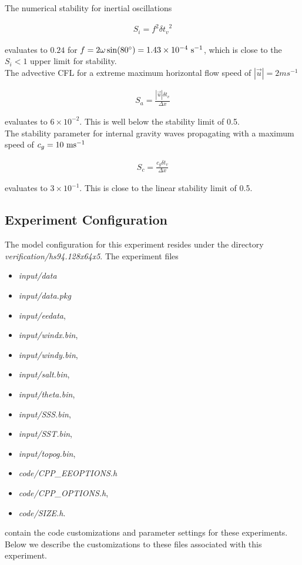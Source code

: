\noindent The numerical stability for inertial oscillations
\cite{adcroft:95} 

\begin{eqnarray}
\label{EQ:eg-hs-inertial_stability}
S_{i} = f^{2} {\delta t_v}^2
\end{eqnarray}

\noindent evaluates to $0.24$ for $f=2\omega\sin(80^{\circ})=1.43\times10^{-4}~{\rm s}^{-1}$, which is close to 
the $S_{i} < 1$ upper limit for stability.
\\

\noindent The advective CFL \cite{adcroft:95} for a extreme maximum 
horizontal flow
speed of $ | \vec{u} | = 2 ms^{-1}$

\begin{eqnarray}
\label{EQ:eg-hs-cfl_stability}
S_{a} = \frac{| \vec{u} | \delta t_{v}}{ \Delta x}
\end{eqnarray}

\noindent evaluates to $6 \times 10^{-2}$. This is well below the stability 
limit of 0.5.
\\

\noindent The stability parameter for internal gravity waves propagating
with a maximum speed of $c_{g}=10~{\rm ms}^{-1}$
\cite{adcroft:95}

\begin{eqnarray}
\label{EQ:eg-hs-gfl_stability}
S_{c} = \frac{c_{g} \delta t_{v}}{ \Delta x}
\end{eqnarray}

\noindent evaluates to $3 \times 10^{-1}$. This is close to the linear
stability limit of 0.5.
  
\subsection{Experiment Configuration}
\label{www:tutorials}
\label{SEC:eg-hs_examp_exp_config}

The model configuration for this experiment resides under the 
directory {\it verification/hs94.128x64x5}.  The experiment files 
\begin{itemize}
\item {\it input/data}
\item {\it input/data.pkg}
\item {\it input/eedata},
\item {\it input/windx.bin},
\item {\it input/windy.bin},
\item {\it input/salt.bin},
\item {\it input/theta.bin},
\item {\it input/SSS.bin},
\item {\it input/SST.bin},
\item {\it input/topog.bin},
\item {\it code/CPP\_EEOPTIONS.h}
\item {\it code/CPP\_OPTIONS.h},
\item {\it code/SIZE.h}. 
\end{itemize}
contain the code customizations and parameter settings for these
experiments. Below we describe the customizations
to these files associated with this experiment.

